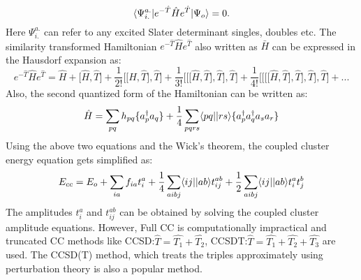 \begin{equation}
\langle \Psi^{a.}_{i.} |e^{-\hat{T}}\hat{H}e^{\hat{T}}| \Psi_o \rangle = 0 .
\end{equation} 
Here $\Psi^{a.}_{i.}$ can refer to any excited Slater determinant singles, doubles etc. 
The similarity transformed Hamiltonian $e^{-\hat{T}}\hat{H}e^{\hat{T}}$ also
written as $\bar{H}$ can be expressed in the Hausdorf expansion
\cite{Merzbacher70}as:
\begin{equation}
e^{-\hat{T}}\hat{H}e^{\hat{T}} = \hat{H} + \lbrack\hat{H},\hat{T}\rbrack + \frac{1}{2!}\lbrack\lbrack\hat{H},\hat{T}\rbrack,\hat{T}\rbrack + \frac{1}{3!}\lbrack\lbrack\lbrack\hat{H},\hat{T}\rbrack,\hat{T}\rbrack,\hat{T}\rbrack + \frac{1}{4!}\lbrack\lbrack\lbrack\lbrack\hat{H},\hat{T}\rbrack,\hat{T}\rbrack,\hat{T}\rbrack,\hat{T}\rbrack + ...
\end{equation}
Also, the second quantized form of the Hamiltonian can be written as\cite{Crawford00}:
\begin{equation}
\hat{H} = \sum_{pq}h_{pq}\{a^\dagger_pa_q\} + \frac{1}{4}\sum_{pqrs}\langle pq || rs \rangle\{a^\dagger_pa^\dagger_qa_sa_r\}
\end{equation}
Using the above two equations and the Wick's theorem\cite{Wick50}, the coupled cluster energy
equation gets simplified as:
\begin{equation}
E_{cc} = E_o + \sum_{ia}f_{ia}t^a_i + \frac{1}{4}\sum_{aibj}\langle ij || ab \rangle t^{ab}_{ij} + \frac{1}{2}\sum_{aibj}\langle ij || ab \rangle t^a_it^b_j
\end{equation} The amplitudes $t^a_i$ and $t^{ab}_{ij}$ can be obtained by
solving the coupled cluster amplitude equations. However, Full CC is
computationally impractical and truncated CC methods like CCSD:\;$\hat{T} =
\hat{T_1} + \hat{T_2}$, CCSDT:\;$\hat{T} = \hat{T_1} + \hat{T_2} + \hat{T_3}$ 
are used. The CCSD(T)\cite{Shen12} method, which treats the triples approximately using
perturbation theory is also a popular method.
